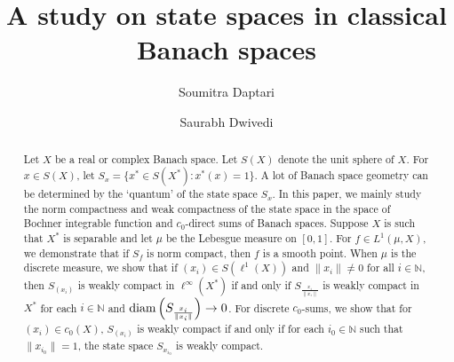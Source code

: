 \documentclass[12pt]{amsart}
\theoremstyle{definition}
\numberwithin{equation}{section}
\begin{document}

\baselineskip=17pt


\title[A study on state spaces in classical Banach spaces]{A study on state spaces in classical Banach spaces}

\author[S. Daptari]{Soumitra Daptari}
\address{Department of Mathematics\\Shiv Nadar Institution of Eminence\\ Gautam Buddha Nagar Delhi NCR, Uttar Pradesh-201314, India}

\author[S. Dwivedi]{Saurabh Dwivedi}
\address{Department of Mathematics\\Shiv Nadar Institution of Eminence\\ Gautam Buddha Nagar Delhi NCR, Uttar Pradesh-201314, India}


\date{}


\begin{abstract}
Let $X$ be a real or complex Banach space. Let $S(X)$ denote the unit sphere of $X$. For $x\in S(X)$, let $S_{x}=\{x^*\in S(X^*):x^*(x)=1\}$. A lot of Banach space geometry can be determined by the `quantum' of the state space $S_{x}$. In this paper, we mainly study the norm compactness and weak compactness of the state space in the space of Bochner integrable function and $c_{0}$-direct sums of Banach spaces. Suppose $X$ is such that $X^*$ is  separable and let $\mu$ be the Lebesgue measure on $[0,1]$. For $f\in L^1(\mu,X)$, we demonstrate that if $S_{f}$ is norm compact, then $f$ is a smooth point. When $\mu$ is the discrete measure, we show that if $ (x_i) \in S(\ell^{1}(X))$ and $ \|x_{i}\|\neq 0$ for all $i\in{\mathbb{N}}$, then $ S_{(x_i)}$ is weakly compact in $ \ell^\infty(X^*) $ if and only if $ S_{\frac{x_i}{\|x_i\|}} $ is weakly compact in $X^*$ for each $i\in{\mathbb{N}}$ and $\textup{diam}\left(S_{\frac{x_i}{\|x_i\|}}\right) \to 0 $. For discrete $c_{0}$-sums, we show that for $(x_{i})\in c_{0}(X)$, $S_{(x_{i})}$ is weakly  compact if and only if for each $i_{0}\in \mathbb{N}$ such that $\|x_{i_{0}}\|=1$, the state space $S_{x_{i_{0}}}$ is weakly compact.
\end{abstract}

\end{document}
